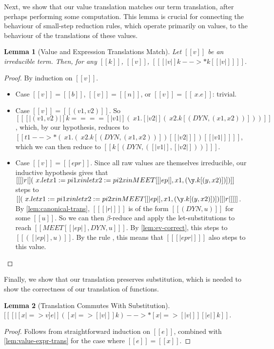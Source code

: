 \documentclass[11pt]{article}
\newtheorem{lemma}{Lemma}[section]
\newcommand{\rrule}[1]{\rref*{#1}}
\begin{document}
Next, we show that our value translation matches our term translation, after perhaps performing
some computation. This lemma is crucial for connecting the behaviour of small-step reduction rules,
which operate primarily on values, to the behaviour of the translations of these values.


\begin{lemma}[Value and Expression Translations Match]
	\label{lem:value-expr-trans}
	Let $[[v]]$ be an irreducible term. Then, for any $[[k]]$, $[[v]]$, $[[ [|v|]k -->* k [ [|v|] ]  ]]$.
\end{lemma}
\begin{proof}
	By induction on $[[v]]$. 

	\begin{itemize}
		\item Case $[[v]] = [[b]]$, $[[v]] = [[n]]$, or $[[v]] = [[\ x  . e]]$: trivial.
		\item Case $[[v]] = [[(v1, v2)]]$.
		      So $[[ [|(v1, v2)|]k ==== [| v1 |](\ x1 . [|v2|](\ x2 . k[(DYN, (x1, x2))] ) )  ]]$,
		      which, by our hypothesis, reduces to  $[[t1 -->* (\ x1 . (\ x2 . k[(DYN, (x1, x2))] )[ [|v2|] ] )[ [|v1|] ] ]]$,
		      which we can then reduce to $[[k[(DYN, ([|v1|],[|v2|]))] ]]$.
		\item Case $[[v]] = [[ep r]]$. Since all raw values are themselves irreducible,
		      our inductive hypothesis gives that
		      $[[ [|r|] (\ x . let x1 := pi1 x in let x2 := pi2 x in MEET [ [|ep|],x1, (\y . k [(y,x2)]) ] )]]$
		      steps to $[[(\ x . let x1 := pi1 x in let x2 := pi2 x in MEET [ [|ep|],x1, (\y . k [(y,x2)]) ] )[ [|r|] ] ]]$.
		      By \autoref{lem:canonical-trans}, $[[ [|r|] ]]$ is of the form
		      $[[(DYN, u)]]$ for some $[[u]]$.
		      So we can then $\beta$-reduce and apply the let-substitutions to reach $[[ MEET[ [|ep|], DYN, u ]  ]]$.
		      By \autoref{lem:ev-correct}, this steps to $[[([|ep|], u)]]$.
		      By the rule \rrule{TransformEv}, this means that $[[ [|ep r|] ]]$ also steps to this value.
 

	\end{itemize}
\end{proof}

Finally, we show that our translation preserves substitution, which is needed to show the correctness
of our translation of functions.

\begin{lemma}[Translation Commutes With Substitution]
	\label{lem:subst-commut}
	$[[ [|[x |=> v]e|]([x |=> [|v|] ]k) -->* [x |=> [|v|] ][|e|]k   ]]$.   
\end{lemma} 
\begin{proof}
	Follows from straightforward induction on $[[e]]$, combined with \autoref{lem:value-expr-trans}
	for the case where $[[e]]=[[x]]$.
\end{proof}
\end{document}
